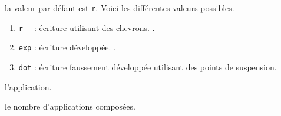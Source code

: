 \documentclass[12pt,a4paper]{article}
\begin{document}

\IDoption{} la valeur par défaut est \verb+r+. 
            Voici les différentes valeurs possibles.
\begin{enumerate}
	\item \verb+r  + : écriture utilisant des chevrons.  \hfill {}.

	\extraspace 
	
	\item \verb+exp+ : écriture développée.  \hfill {}.

	\item \verb+dot+ : écriture faussement développée utilisant des points de suspension.
\end{enumerate}

 l'application.

 le nombre d'applications composées.
\end{document}
